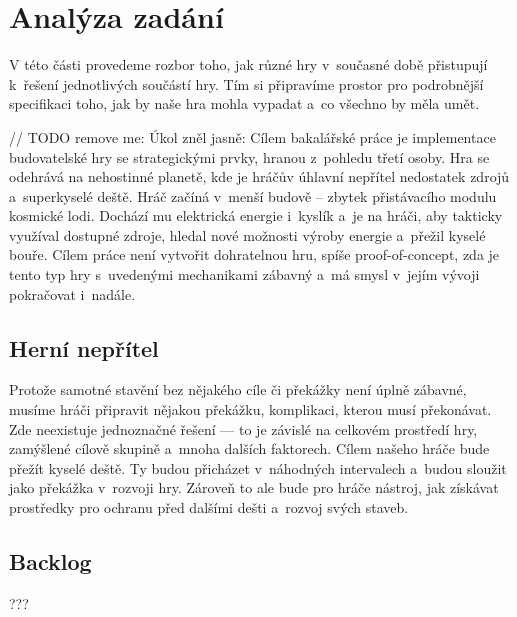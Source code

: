 
\chapter{Analýza zadání}

V této části provedeme rozbor toho, jak různé hry v~současné době přistupují k~řešení jednotlivých součástí hry. Tím si připravíme prostor pro podrobnější specifikaci toho, jak by naše hra mohla vypadat a~co všechno by měla umět.

// TODO remove me:
Úkol zněl jasně: Cílem bakalářské práce je implementace budovatelské hry se strategickými prvky, hranou z~pohledu třetí osoby. Hra se odehrává na nehostinné planetě, kde je hráčův úhlavní nepřítel nedostatek zdrojů a~superkyselé deště. Hráč začíná v~menší budově – zbytek přistávacího modulu kosmické lodi. Dochází mu elektrická energie i~kyslík a~je na hráči, aby takticky využíval dostupné zdroje, hledal nové možnosti výroby energie a~přežil kyselé bouře. Cílem práce není vytvořit dohratelnou hru, spíše proof-of-concept, zda je tento typ hry s~uvedenými mechanikami zábavný a~má smysl v~jejím vývoji pokračovat i~nadále.








\section{Herní nepřítel}
Protože samotné stavění bez nějakého cíle či překážky není úplně zábavné, musíme hráči připravit nějakou překážku, komplikaci, kterou musí překonávat. Zde neexistuje jednoznačné řešení --- to je závislé na celkovém prostředí hry, zamýšlené cílově skupině a~mnoha dalších faktorech. Cílem našeho hráče bude přežít kyselé deště. Ty budou přicházet v~náhodných intervalech a~budou sloužit jako překážka v~rozvoji hry. Zároveň to ale bude pro hráče nástroj, jak získávat prostředky pro ochranu před dalšími dešti a~rozvoj svých staveb. 

\section{Backlog}


???


